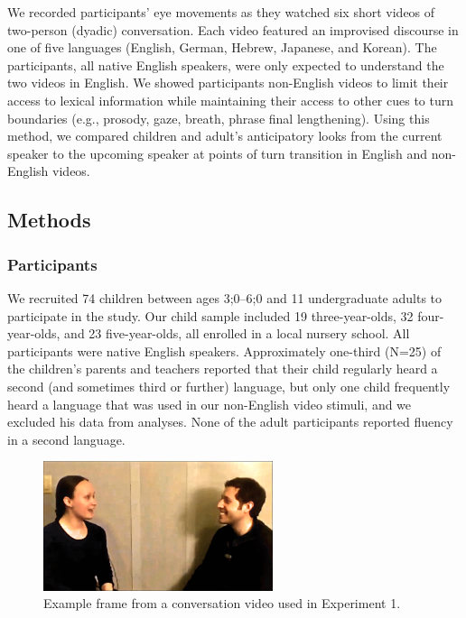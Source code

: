\documentclass[authoryear, 12pt]{elsarticle}
\begin{document}
We recorded participants' eye movements as they watched six short videos of two-person (dyadic) conversation. Each video featured an improvised discourse in one of five languages (English, German, Hebrew, Japanese, and Korean). The participants, all native English speakers, were only expected to understand the two videos in English. We showed participants non-English videos to limit their access to lexical information while maintaining their access to other cues to turn boundaries (e.g., prosody, gaze, breath, phrase final lengthening). Using this method, we compared children and adult's anticipatory looks from the current speaker to the upcoming speaker at points of turn transition in English and non-English videos.

\subsection{Methods}
\label{sec:methods1}

\subsubsection{Participants}

We recruited 74 children between ages 3;0--6;0 and 11 undergraduate adults to participate in the study. Our child sample included 19 three-year-olds, 32 four-year-olds, and 23 five-year-olds, all enrolled in a local nursery school. All participants were native English speakers. Approximately one-third (N=25) of the children's parents and teachers reported that their child regularly heard a second (and sometimes third or further) language, but only one child frequently heard a language that was used in our non-English video stimuli, and we excluded his data from analyses. None of the adult participants reported fluency in a second language.

\begin{figure}[ht]
\begin{center}
\includegraphics[width=0.6\textwidth]{figures/FIG-FL-stim.png}
\end{center}
\caption{Example frame from a conversation video used in Experiment 1.} 
\label{speakers}
\end{figure}
\end{document}

